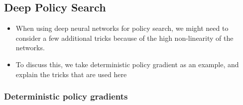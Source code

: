 \subsection{Deep Policy Search}
\begin{itemize}
	\item When using deep neural networks for policy search, we might need to consider a few additional tricks because of the high non-linearity of the networks.
	\item To discuss this, we take deterministic policy gradient as an example, and explain the tricks that are used here
\end{itemize}
\subsubsection{Deterministic policy gradients}
